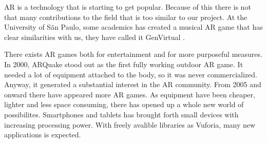 \gls{AR} is a technology that is starting to get popular. Because of this there
is not that many contributions to the field that is too similar to our project.
At the University of S\~{a}n Paulo, some academics has created a musical AR game
that has clear similarities with us, they have called it GenVirtual
\cite{GenVirtual}. 

There exists AR games both for entertainment and for more purposeful
measures\cite{tan2010augmented}. In 2000, ARQuake stood out as the first fully
working outdoor AR game. It needed a lot of equipment attached to the body, so
it was never commercialized. Anyway, it generated a substantial interest in the
AR community. From 2005 and onward there have appeared more AR games. As
equipment have been cheaper, lighter and less space consuming, there has opened
up a whole new world of possibilites. Smartphones and tablets has brought forth
small devices with increasing processing power. With freely avalible libraries
as \gls{Vuforia}, many new applications is expected.